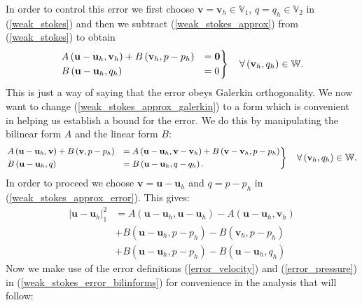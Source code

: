 \documentclass{article}
\begin{document}
In order to control this error we first choose $\textbf{v}=\textbf{v}_h\in\mathbb{V}_1$, $q=q_h\in\mathbb{V}_2$ in (\ref{weak_stokes}) and then we subtract (\ref{weak_stokes_approx}) from (\ref{weak_stokes}) to obtain
\begin{equation}\label{weak_stokes_approx_galerkin}
\begin{rcases}
A\left(\textbf{u}-\textbf{u}_h,\textbf{v}_h\right)+B\left(\textbf{v}_h,p-p_h\right)&=\textbf{0}\\
B\left(\textbf{u}-\textbf{u}_h,q_h\right)&=0
\end{rcases}\quad\forall \left(\textbf{v}_h,q_h\right)\in \mathbb{W}.
\end{equation}
This is just a way of saying that the error obeys Galerkin orthogonality.  We now want to change (\ref{weak_stokes_approx_galerkin}) to a form which is convenient in helping us establish a bound for the error.  We do this by manipulating the bilinear form $A$ and the linear form $B$:
\begin{equation}\small \label{weak_stokes_approx_error}
\begin{rcases}
A\left(\textbf{u}-\textbf{u}_h,\textbf{v}\right)+B\left(\textbf{v},p-p_h\right)&=A\left(\textbf{u}-\textbf{u}_h,\textbf{v}-\textbf{v}_h\right)+B\left(\textbf{v}-\textbf{v}_h,p-p_h\right)\\
B\left(\textbf{u}-\textbf{u}_h,q\right)&=B\left(\textbf{u}-\textbf{u}_h,q-q_h\right).
\end{rcases}\quad\forall \left(\textbf{v}_h,q_h\right)\in \mathbb{W}.
\end{equation}
In order to proceed we choose $\textbf{v}=\textbf{u}-\textbf{u}_h$ and $q=p-p_h$ in (\ref{weak_stokes_approx_error}).  This gives:
\begin{equation} \label{weak_stokes_error_bilinforms}
\begin{aligned}
\left|\textbf{u}-\textbf{u}_h\right|^2_1 &=A\left(\textbf{u}-\textbf{u}_h,\textbf{u}-\textbf{u}_h\right)-A\left(\textbf{u}-\textbf{u}_h,\textbf{v}_h\right)\\
&+B\left(\textbf{u}-\textbf{u}_h,p-p_h\right)-B\left(\textbf{v}_h,p-p_h\right)\\
&+B\left(\textbf{u}-\textbf{u}_h,p-p_h\right)-B\left(\textbf{u}-\textbf{u}_h,q_h\right)
\end{aligned}
\end{equation}
Now we make use of the error definitions (\ref{error_velocity}) and (\ref{error_pressure}) in (\ref{weak_stokes_error_bilinforms}) for convenience in the analysis that will follow:
\end{document}
